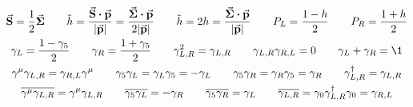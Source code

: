 \begin{gather*}
        \va{S} = \frac{1}{2}\va*{\Sigma}
        \qquad
        \tilde{h}
        = \frac{\va{S}\vdot\va{p}}{\abs{\va{p}}}
        = \frac{\va*{\Sigma}\vdot\va{p}}{2\abs{\va{p}}}
        \qquad
        \tilde{h}
        = 2h
        = \frac{\va*{\Sigma}\vdot\va{p}}{\abs{\va{p}}}
        \qquad
        P_L = \frac{1 - h}{2}
        \qquad
        P_R = \frac{1 + h}{2}
        \\
        \gamma_L = \frac{1 - \gamma_5}{2}
        \qquad
        \gamma_R = \frac{1 + \gamma_5}{2}
        \qquad
        \gamma_{L,R}^2 = \gamma_{L,R}
        \qquad
        \gamma_{L,R}\gamma_{R,L} = 0
        \qquad
        \gamma_L + \gamma_R = \1
        \\
        \gamma^\mu\gamma_{L,R} = \gamma_{R,L}\gamma^\mu
        \qquad
        \gamma_5\gamma_{L} = \gamma_{L}\gamma_5 = -\gamma_{L}
        \qquad
        \gamma_5\gamma_{R} = \gamma_{R}\gamma_5 = \gamma_{R}
        \qquad
        \gamma_{L,R}^\dagger = \gamma_{L,R}
        \\
        \overline{\gamma^\mu\gamma_{L,R}} = \gamma^\mu\gamma_{L,R}
        \qquad
        \overline{\gamma_5\gamma_{L}} = -\gamma_{R}
        \qquad
        \overline{\gamma_5\gamma_{R}} = \gamma_{L}
        \qquad
        \overline{\gamma_{L,R}}
        = \gamma_0\gamma_{L,R}^\dagger\gamma_0
        = \gamma_{R,L}
\end{gather*}

